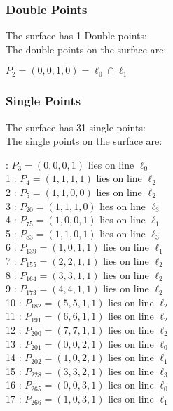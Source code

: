 \documentclass{article}
\begin{document}
{\subsubsection*{Double Points}
The surface has 1 Double points:\\
The double points on the surface are:\\
\begin{multicols}{2}
\noindent
$P_{2} = ( 0, 0, 1, 0 ) = \ell_{0} \cap \ell_{1} $\\
\end{multicols}
\subsubsection*{Single Points}
The surface has 31 single points:\\
The single points on the surface are:\\
\begin{multicols}{2}
 : $P_{3}=( 0, 0, 0, 1 )$ lies on line $\ell_{0}$\\
1 : $P_{4}=( 1, 1, 1, 1 )$ lies on line $\ell_{2}$\\
2 : $P_{5}=( 1, 1, 0, 0 )$ lies on line $\ell_{2}$\\
3 : $P_{20}=( 1, 1, 1, 0 )$ lies on line $\ell_{3}$\\
4 : $P_{75}=( 1, 0, 0, 1 )$ lies on line $\ell_{1}$\\
5 : $P_{83}=( 1, 1, 0, 1 )$ lies on line $\ell_{3}$\\
6 : $P_{139}=( 1, 0, 1, 1 )$ lies on line $\ell_{1}$\\
7 : $P_{155}=( 2, 2, 1, 1 )$ lies on line $\ell_{2}$\\
8 : $P_{164}=( 3, 3, 1, 1 )$ lies on line $\ell_{2}$\\
9 : $P_{173}=( 4, 4, 1, 1 )$ lies on line $\ell_{2}$\\
10 : $P_{182}=( 5, 5, 1, 1 )$ lies on line $\ell_{2}$\\
11 : $P_{191}=( 6, 6, 1, 1 )$ lies on line $\ell_{2}$\\
12 : $P_{200}=( 7, 7, 1, 1 )$ lies on line $\ell_{2}$\\
13 : $P_{201}=( 0, 0, 2, 1 )$ lies on line $\ell_{0}$\\
14 : $P_{202}=( 1, 0, 2, 1 )$ lies on line $\ell_{1}$\\
15 : $P_{228}=( 3, 3, 2, 1 )$ lies on line $\ell_{3}$\\
16 : $P_{265}=( 0, 0, 3, 1 )$ lies on line $\ell_{0}$\\
17 : $P_{266}=( 1, 0, 3, 1 )$ lies on line $\ell_{1}$\\

\end{multicols}}
\end{document}
